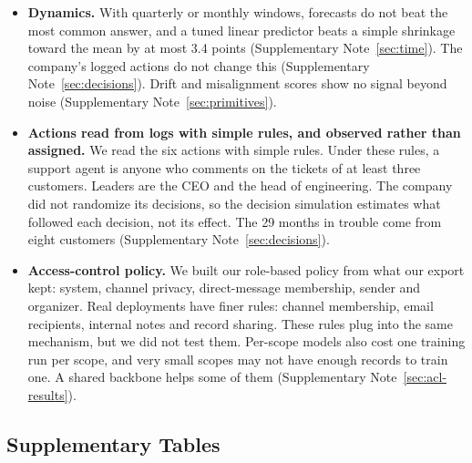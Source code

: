 \documentclass[11pt]{article}
\begin{document}
\begin{itemize}
The four seeds of the anchored version vary the reader and the anchors but not the state encoder, which is one run. We did not test questions that need several systems' records at once, or that come with several records of the customer.
\item \textbf{Dynamics.} With quarterly or monthly windows, forecasts do not beat the most common answer, and a tuned linear predictor beats a simple shrinkage toward the mean by at most 3.4 points (Supplementary Note~\ref{sec:time}). The company's logged actions do not change this (Supplementary Note~\ref{sec:decisions}). Drift and misalignment scores show no signal beyond noise (Supplementary Note~\ref{sec:primitives}).
\item \textbf{Actions read from logs with simple rules, and observed rather than assigned.} We read the six actions with simple rules. Under these rules, a support agent is anyone who comments on the tickets of at least three customers. Leaders are the CEO and the head of engineering. The company did not randomize its decisions, so the decision simulation estimates what followed each decision, not its effect. The 29 months in trouble come from eight customers (Supplementary Note~\ref{sec:decisions}).
\item \textbf{Access-control policy.} We built our role-based policy from what our export kept: system, channel privacy, direct-message membership, sender and organizer. Real deployments have finer rules: channel membership, email recipients, internal notes and record sharing. These rules plug into the same mechanism, but we did not test them. Per-scope models also cost one training run per scope, and very small scopes may not have enough records to train one. A shared backbone helps some of them (Supplementary Note~\ref{sec:acl-results}).
\end{itemize}

\clearpage
\subsection{Supplementary Tables}
\end{document}
